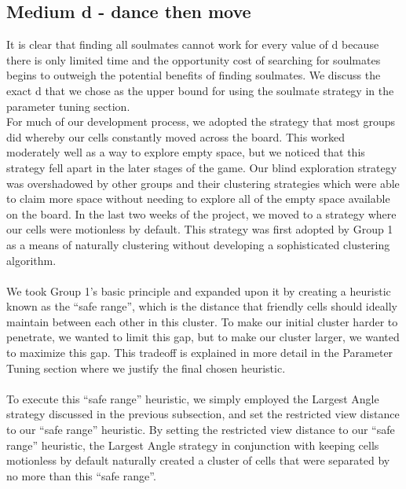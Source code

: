 \subsection{Medium d - dance then move}
It is clear that finding all soulmates cannot work for every value of d because there is only limited time and the opportunity cost of searching for soulmates begins to outweigh the potential benefits of finding soulmates. We discuss the exact d that we chose as the upper bound for using the soulmate strategy in the parameter tuning section.\\

For much of our development process, we adopted the strategy that most groups did whereby our cells constantly moved across the board. This worked moderately well as a way to explore empty space, but we noticed that this strategy fell apart in the later stages of the game. Our blind exploration strategy was overshadowed by other groups and their clustering strategies which were able to claim more space without needing to explore all of the empty space available on the board. In the last two weeks of the project, we moved to a strategy where our cells were motionless by default. This strategy was first adopted by Group 1 as a means of naturally clustering without developing a sophisticated clustering algorithm.\\\\
We took Group 1’s basic principle and expanded upon it by creating a heuristic known as the “safe range”, which is the distance that friendly cells should ideally maintain between each other in this cluster. To make our initial cluster harder to penetrate, we wanted to limit this gap, but to make our cluster larger, we wanted to maximize this gap. This tradeoff is explained in more detail in the Parameter Tuning section where we justify the final chosen heuristic.\\\\
To execute this “safe range” heuristic, we simply employed the Largest Angle strategy discussed in the previous subsection, and set the restricted view distance to our “safe range” heuristic. By setting the restricted view distance to our “safe range” heuristic, the Largest Angle strategy in conjunction with keeping cells motionless by default naturally created a cluster of cells that were separated by no more than this “safe range”.\\\\

